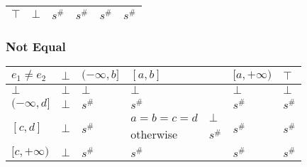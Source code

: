 \documentclass{beamer}
\begin{document}
\begin{frame}
\begin{table}
{\begin{tabular}{|l|l|ll|ll|ll|l|}
        $\top$                          & $\bot$                  & \multicolumn{2}{l|}{$s^\#$}                                                        & \multicolumn{2}{l|}{$s^\#$}                                    & \multicolumn{2}{l|}{$s^\#$}                                                  & $s^\#$                                          \\ \hline
        \end{tabular}}
        \end{table}
    \end{frame}
    
        \begin{frame}
            \frametitle{Not Equal}
    \begin{table}
        \begin{tabular}{|l|l|ll|ll|ll|l|}
        \hline
        $e_1 \ne e_2$                   & $\bot$                  & \multicolumn{2}{l|}{$(-\infty, b]$}          & \multicolumn{2}{l|}{$[a, b]$}                & \multicolumn{2}{l|}{$[a, +\infty)$}          & $\top$                  \\ \hline
        $\bot$                          & $\bot$                  & \multicolumn{2}{l|}{$\bot$}                  & \multicolumn{2}{l|}{$\bot$}                  & \multicolumn{2}{l|}{$\bot$}                  & $\bot$                  \\ \hline
        $(-\infty, d]$                  & $\bot$                  & \multicolumn{2}{l|}{$s^\#$}                  & $s^\#$                     &                 & \multicolumn{2}{l|}{$s^\#$}                  & $s^\#$                  \\ \hline
        \multirow{2}{*}{$[c, d]$}       & \multirow{2}{*}{$\bot$} & \multicolumn{2}{l|}{\multirow{2}{*}{$s^\#$}} & $a = b = c = d$            & $\bot$          & \multicolumn{2}{l|}{\multirow{2}{*}{$s^\#$}} & \multirow{2}{*}{$s^\#$} \\
                                        &                         & \multicolumn{2}{l|}{}                        & otherwise                  & $s^\#$          & \multicolumn{2}{l|}{}                        &                         \\ \hline
        \multirow{3}{*}{$[c, +\infty)$} & \multirow{3}{*}{$\bot$} & \multicolumn{2}{l|}{\multirow{3}{*}{$s^\#$}} & \multicolumn{2}{l|}{\multirow{3}{*}{$s^\#$}} & \multicolumn{2}{l|}{\multirow{3}{*}{$s^\#$}} & \multirow{3}{*}{$s^\#$} \\
                                        &                         & \multicolumn{2}{l|}{}                        & \multicolumn{2}{l|}{}                        & \multicolumn{2}{l|}{}                        &                         \\

\end{tabular}
\end{table}
\end{frame}
\end{document}
